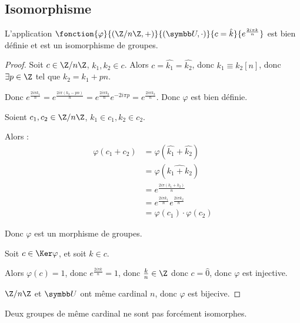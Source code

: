 \subsection{Isomorphisme}

\begin{theoreme}{}{}
    L'application $\fonction{\varphi}{(\Z/n\Z, +)}{(\symbb U, \cdot)}{c = \hat k}{e^{\frac{2i\pi k} n}}$
    est bien définie et est un isomorphisme de groupes.
\end{theoreme}

\begin{proof}
    Soit $c \in \Z /n \Z$, $k_1, k_2 \in c$. Alors $c = \hat{k_1} = \hat{k_2}$, donc
    $k_1 \equiv k_2 [n]$, donc $\exists p \in \Z$ tel que $k_2 = k_1 + pn$.

    Donc $\displaystyle e^{\frac{2i\pi k_1}n} = e^{\frac{2i\pi (k_2 - pn)} n} = e^{\frac{2i\pi k_2} n} e^{-2i\pi p} = e^{\frac{2i\pi k_2} n}$.
    Donc $\varphi$ est bien définie.

    \svspace Soient $c_1, c_2 \in \Z/n\Z$, $k_1 \in c_1, k_2 \in c_2$.

    Alors :
     \begin{align*}
        \varphi(c_1 + c_2) & = \varphi(\hat{k_1} + \hat{k_2}) \\
        & = \varphi(\widehat{k_1 + k_2}) \\
        & = e^{\frac{2i\pi (k_1 + k_2)} n} \\
        & = e^{\frac{2i\pi k_1} n} e^{\frac{2i\pi k_2} n} \\
        & = \varphi(c_1) \cdot \varphi(c_2)
    \end{align*}

    Donc $\varphi$ est un morphisme de groupes.

    Soit $c \in \Ker \varphi$, et soit $k \in c$.

    Alors $\varphi(c) = 1$, donc $e^{\frac{2i\pi k} n} = 1$, donc $\frac k n \in \Z$ donc 
    $c = \hat 0$, donc $\varphi$ est injective.

    \avspace $\Z / n \Z$ et $\symbb U$ ont même cardinal $n$, donc $\varphi$ est bijecive.
\end{proof}

\begin{remarque}
    Deux groupes de même cardinal ne sont pas forcément isomorphes.
\end{remarque}


